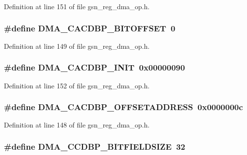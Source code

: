 Definition at line 151 of file gsn\_\-reg\_\-dma\_\-op.h.

\hypertarget{a00547_ab0eb3182f93b277d7d51d49c3f001c44}{
\subsubsection[{DMA\_\-CACDBP\_\-BITOFFSET}]{\setlength{\rightskip}{0pt plus 5cm}\#define DMA\_\-CACDBP\_\-BITOFFSET~0}}
\label{a00547_ab0eb3182f93b277d7d51d49c3f001c44}


Definition at line 149 of file gsn\_\-reg\_\-dma\_\-op.h.

\hypertarget{a00547_a89d1fca86188262766d80354702c886e}{
\subsubsection[{DMA\_\-CACDBP\_\-INIT}]{\setlength{\rightskip}{0pt plus 5cm}\#define DMA\_\-CACDBP\_\-INIT~0x00000090}}
\label{a00547_a89d1fca86188262766d80354702c886e}


Definition at line 152 of file gsn\_\-reg\_\-dma\_\-op.h.

\hypertarget{a00547_aa27683ff86911fe87d8d98d51a74800d}{
\subsubsection[{DMA\_\-CACDBP\_\-OFFSETADDRESS}]{\setlength{\rightskip}{0pt plus 5cm}\#define DMA\_\-CACDBP\_\-OFFSETADDRESS~0x0000000c}}
\label{a00547_aa27683ff86911fe87d8d98d51a74800d}


Definition at line 148 of file gsn\_\-reg\_\-dma\_\-op.h.

\hypertarget{a00547_a989faedaed8ced3e17f0d877644eece3}{
\subsubsection[{DMA\_\-CCDBP\_\-BITFIELDSIZE}]{\setlength{\rightskip}{0pt plus 5cm}\#define DMA\_\-CCDBP\_\-BITFIELDSIZE~32}}
\label{a00547_a989faedaed8ced3e17f0d877644eece3}


